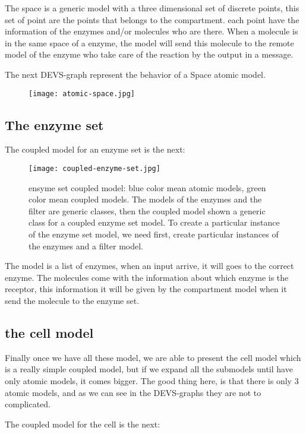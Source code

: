 \documentclass[12pt]{article}
\begin{document}
The space is a generic model with a three dimensional set of discrete points, this set of point are the points that belongs to the compartment. each point have the information of the enzymes and/or molecules who are there. When a molecule is in the same space of a enzyme, the model will send this molecule to the remote model of the enzyme who take care of the reaction by the output in a message.
 
The next DEVS-graph represent the behavior of a Space atomic model.


\begin{figure}[h!]
 \centering
  \texttt{[image: atomic-space.jpg]}
\end{figure}

\newpage
\subsection*{The enzyme set}

The coupled model for an enzyme set is the next:

\begin{figure}[h!]
 \centering
  \texttt{[image: coupled-enzyme-set.jpg]}
 \caption{ensyme set coupled model: blue color mean atomic models, green color mean coupled models. The models of the enzymes and the filter are generic classes, then the coupled model shown a generic class for a coupled enzyme set model. To create a particular instance of the enzyme set model, we need first, create particular instances of the enzymes and a filter model.}
\end{figure}

The model is a list of enzymes, when an input arrive, it will goes to the correct enzyme. The molecules come with the information about which enzyme is the receptor, this information it will be given by the compartment model when it send the molecule to the enzyme set.

\subsection*{the cell model}
Finally once we have all these model, we are able to present the cell model which is a really simple coupled model, but if we expand all the submodels until have only atomic models, it comes bigger. The good thing here, is that there is only 3 atomic models, and as we can see in the DEVS-graphs they are not to complicated.

\newpage
The coupled model for the cell is the next:
\end{document}
